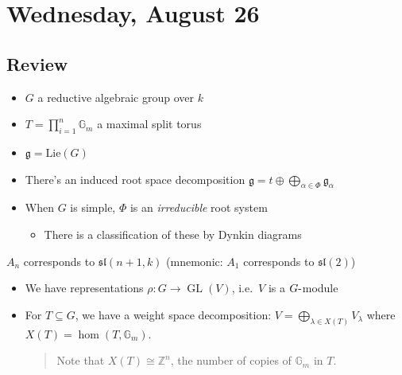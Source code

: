 \hypertarget{wednesday-august-26}{%
\section{Wednesday, August 26}\label{wednesday-august-26}}

\hypertarget{review}{%
\subsection{Review}\label{review}}

\begin{itemize}
\tightlist
\item
  \(G\) a reductive algebraic group over \(k\)
\item
  \(T = \prod_{i=1}^n {\mathbb{G}}_m\) a maximal split torus
\item
  \({\mathfrak{g}}= \mathrm{Lie}(G)\)
\item
  There's an induced root space decomposition
  \({\mathfrak{g}}= t\oplus \bigoplus_{\alpha\in \Phi}{\mathfrak{g}}_\alpha\)
\item
  When \(G\) is simple, \(\Phi\) is an \emph{irreducible} root system

  \begin{itemize}
  \tightlist
  \item
    There is a classification of these by Dynkin diagrams
  \end{itemize}
\end{itemize}

\begin{example}

\(A_n\) corresponds to \({\mathfrak{sl}}(n+1, k)\) (mnemonic: \(A_1\)
corresponds to \({\mathfrak{sl}}(2)\))

\end{example}

\begin{itemize}
\item
  We have representations \(\rho: G\to \operatorname{GL}(V)\),
  i.e.~\(V\) is a \(G{\hbox{-}}\)module
\item
  For \(T\subseteq G\), we have a weight space decomposition:
  \(V = \bigoplus_{\lambda \in X(T)} V_\lambda\) where
  \(X(T) = \hom(T, {\mathbb{G}}_m)\).

  \begin{quote}
  Note that \(X(T) \cong {\mathbb{Z}}^n\), the number of copies of
  \({\mathbb{G}}_m\) in \(T\).
  \end{quote}
\end{itemize}

